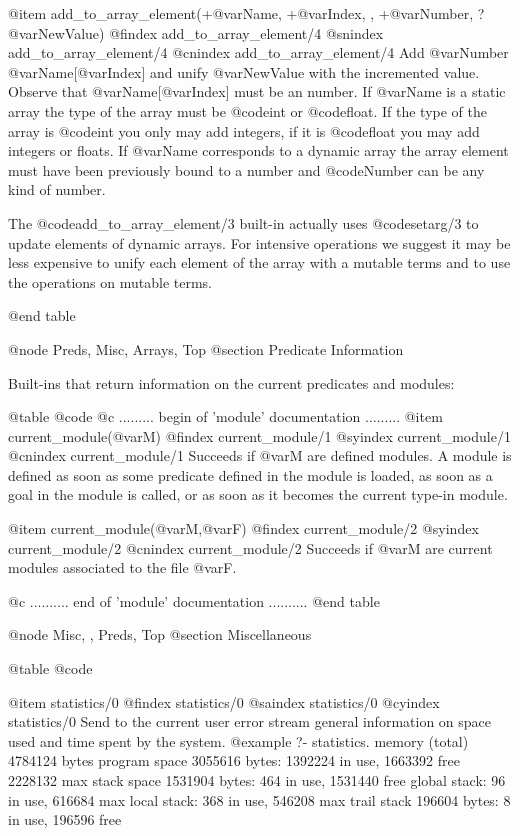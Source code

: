 {{{{{{{@item add_to_array_element(+@var{Name}, +@var{Index}, , +@var{Number}, ?@var{NewValue}) 
@findex add_to_array_element/4
@snindex add_to_array_element/4
@cnindex add_to_array_element/4
Add @var{Number} @var{Name}[@var{Index}] and unify @var{NewValue} with
the incremented value. Observe that @var{Name}[@var{Index}] must be an
number. If @var{Name} is a static array the type of the array must be
@code{int} or @code{float}. If the type of the array is @code{int} you
only may add integers, if it is @code{float} you may add integers or
floats. If @var{Name} corresponds to a dynamic array the array element
must have been previously bound to a number and @code{Number} can be
any kind of number.

The @code{add_to_array_element/3} built-in actually uses
@code{setarg/3} to update elements of dynamic arrays. For intensive
operations we suggest it may be less expensive to unify each element
of the array with a mutable terms and to use the operations on mutable
terms.

@end table

@node Preds, Misc, Arrays, Top
@section Predicate Information

Built-ins that return information on the current predicates and modules:

@table @code
@c ......... begin of 'module' documentation .........
@item current_module(@var{M})
@findex current_module/1
@syindex current_module/1
@cnindex current_module/1
Succeeds if @var{M} are defined modules. A module is defined as soon as some
predicate defined in the module is loaded, as soon as a goal in the
module is called, or as soon as it becomes the current type-in module.

@item current_module(@var{M},@var{F})
@findex current_module/2
@syindex current_module/2
@cnindex current_module/2
Succeeds if @var{M} are current modules associated to the file @var{F}.

@c .......... end of 'module' documentation ..........
@end table

@node Misc, , Preds, Top
@section Miscellaneous

@table @code

@item statistics/0
@findex statistics/0
@saindex statistics/0
@cyindex statistics/0
Send to the current user error stream general information on space used and time
spent by the system.
@example
?- statistics.
memory (total)        4784124 bytes
   program space      3055616 bytes:    1392224 in use,      1663392 free
                                                             2228132  max
   stack space        1531904 bytes:        464 in use,      1531440 free
     global stack:                           96 in use,       616684  max
      local stack:                          368 in use,       546208  max
   trail stack         196604 bytes:          8 in use,       196596 free

}}}}}}}
